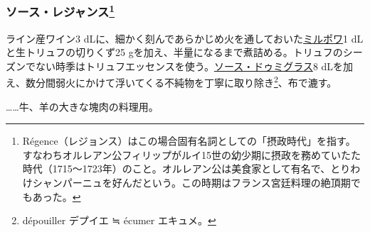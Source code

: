 \begin{recette}
\hypertarget{sauce-regence}{%
\subsubsection[ソース・レジャンス]{\texorpdfstring{ソース・レジャンス\footnote{Régence（レジョンス）はこの場合固有名詞としての「摂政時代」を指す。すなわちオルレアン公フィリップがルイ15世の幼少期に摂政を務めていたた時代（1715〜1723年）のこと。オルレアン公は美食家として有名で、とりわけシャンパーニュを好んだという。この時期はフランス宮廷料理の絶頂期でもあった。}}{ソース・レジャンス}}\label{sauce-regence}}



ライン産ワイン3
dLに、細かく刻んであらかじめ火を通しておいた\protect\hyperlink{mirepoix}{ミルポワ}1
dLと生トリュフの切りくず25
gを加え、半量になるまで煮詰める。トリュフのシーズンでない時季はトリュフエッセンスを使う。\protect\hyperlink{sauce-demi-glace}{ソース・ドゥミグラス}8
dLを加え、数分間弱火にかけて浮いてくる不純物を丁寧に取り除き\footnote{dépouiller
  デプイエ ≒ écumer エキュメ。}、布で漉す。

\ldots{}\ldots{}牛、羊の大きな塊肉の料理用。

\hypertarget{sauce-robert}{%
}
\end{recette}
